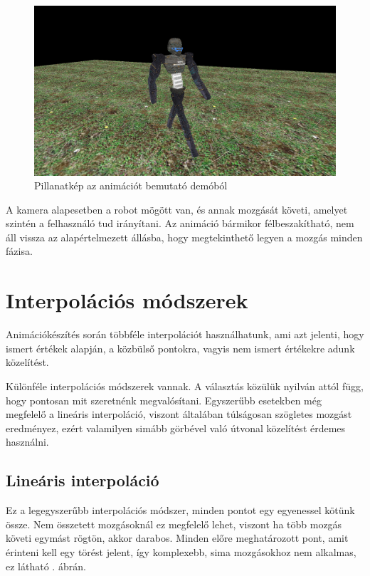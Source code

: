 \begin{figure}[h]
\centering
\includegraphics[scale=0.4]{kepek/animation_demo.png}
\caption[]{Pillanatkép az animációt bemutató demóból}
\label{fig:anim_demo}
\end{figure}

A kamera alapesetben a robot mögött van, és annak mozgását követi, amelyet szintén a felhasználó tud irányítani. Az animáció bármikor félbeszakítható, nem áll vissza az alapértelmezett állásba, hogy megtekinthető legyen a mozgás minden fázisa.

\section{Interpolációs módszerek}


Animációkészítés során többféle interpolációt használhatunk, ami azt jelenti, hogy ismert értékek alapján, a közbülső pontokra, vagyis nem ismert értékekre adunk közelítést.

Különféle interpolációs módszerek vannak. A választás közülük nyilván attól függ, hogy pontosan mit szeretnénk megvalósítani. Egyszerűbb esetekben még megfelelő a lineáris interpoláció, viszont általában túlságosan szögletes mozgást eredményez, ezért valamilyen simább görbével való útvonal közelítést érdemes használni.

\subsection{Lineáris interpoláció}

Ez a legegyszerűbb interpolációs módszer, minden pontot egy egyenessel kötünk össze. Nem összetett mozgásoknál ez megfelelő lehet, viszont ha több mozgás követi egymást rögtön, akkor darabos. Minden előre meghatározott pont, amit érinteni kell egy törést jelent, így komplexebb, sima mozgásokhoz nem alkalmas, ez látható . ábrán.

